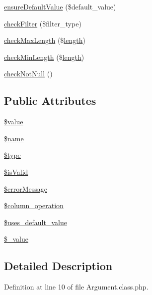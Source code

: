\begin{DoxyCompactItemize}
\item 
\hyperlink{classArgument_a4af92bc005f3d9328c63c0722fd3aef7}{ensure\+Default\+Value} (\$default\+\_\+value)
\item 
\hyperlink{classArgument_a4bdf58953a9b85a8999edabe5d341d43}{check\+Filter} (\$filter\+\_\+type)
\item 
\hyperlink{classArgument_acc5f170121988acf71c50e5941320112}{check\+Max\+Length} (\$\hyperlink{xpresseditor_8min_8js_a8251a40bc2803d85bf8a918f1f288cce}{length})
\item 
\hyperlink{classArgument_ac44c716b86dc42d5c0f0e4717a510c74}{check\+Min\+Length} (\$\hyperlink{xpresseditor_8min_8js_a8251a40bc2803d85bf8a918f1f288cce}{length})
\item 
\hyperlink{classArgument_a09edcec0bf4dbfeedec2f7652e44e57d}{check\+Not\+Null} ()
\end{DoxyCompactItemize}
\subsection*{Public Attributes}
\begin{DoxyCompactItemize}
\item 
\hyperlink{classArgument_a762eb8881d615f61189bba09b9bd7300}{\$value}
\item 
\hyperlink{classArgument_ab37a45cb92464255505b2f4f35909da6}{\$name}
\item 
\hyperlink{classArgument_a7a2272bc3d12787f80143fbea01698f4}{\$type}
\item 
\hyperlink{classArgument_af1a5d4055fd3e16bea7951843a3bdd92}{\$is\+Valid}
\item 
\hyperlink{classArgument_ad0af83b11507626a9c95fd188e60b592}{\$error\+Message}
\item 
\hyperlink{classArgument_a366cb3ac7d44ed1037c96ca2bfad6be4}{\$column\+\_\+operation}
\item 
\hyperlink{classArgument_a3f8f20477043da002ba9d48ede482baf}{\$uses\+\_\+default\+\_\+value}
\item 
\hyperlink{classArgument_aba96b050a81b62ccf10a78638d208353}{\$\+\_\+value}
\end{DoxyCompactItemize}


\subsection{Detailed Description}


Definition at line 10 of file Argument.\+class.\+php.



